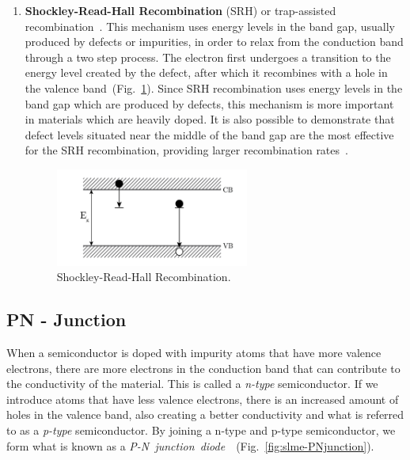 \begin{refsection}
\begin{enumerate}[]
\vspace{0.2in}
	\item\textbf{Shockley-Read-Hall Recombination} (SRH) or trap-assisted recombination~\cite{Shockley1952}\cite{Hall1952}. This mechanism uses energy levels in the band gap, usually produced by defects or impurities, in order to relax from the conduction band through a two step process. The electron first undergoes a transition to the energy level created by the defect, after which it recombines with a hole in the valence band~(Fig.~\ref{fig:slme-SRHrec}). Since SRH recombination uses energy levels in the band gap which are produced by defects, this mechanism is more important in materials which are heavily doped. It is also possible to demonstrate that defect levels situated near the middle of the band gap are the most effective for the SRH recombination, providing larger recombination rates~\cite{Green1981}.

\begin{figure}[!htp] 
\centering
\includegraphics[width=0.6\textwidth]{./Figures/slme/SRHrec.png}
\caption{\label{fig:slme-SRHrec}Shockley-Read-Hall Recombination.}
\end{figure}

\end{enumerate}

\pagebreak[4]
\subsection{PN - Junction}

When a semiconductor is doped with impurity atoms that have more valence electrons, there are more electrons in the conduction band that can contribute to the conductivity of the material. This is called a \textit{n-type} semiconductor. If we introduce atoms that have less valence electrons, there is an increased amount of holes in the valence band, also creating a better conductivity and what is referred to as a \textit{p-type} semiconductor. By joining a n-type and p-type semiconductor, we form what is known as a \textit{P-N~junction~diode}~\cite{Shockley1949}~(Fig.~\ref{fig:slme-PNjunction}).


\end{refsection}

